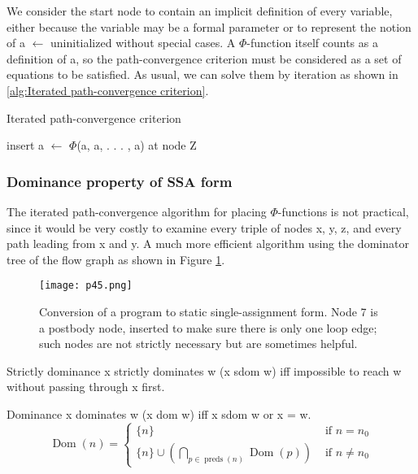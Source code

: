 We consider the start node to contain an implicit definition of every variable, either because the variable may be a formal parameter or to represent the notion of a
$\leftarrow$ uninitialized without special cases. A $\Phi$-function itself counts as a definition of a, so the path-convergence criterion must be considered as a set of equations to be satisfied. As usual, we can solve them by iteration as shown in \ref{alg:Iterated path-convergence criterion}.


\begin{algorithm}
	\caption{Iterated path-convergence criterion}\label{alg:Iterated path-convergence criterion}
	\begin{algorithmic}

		\State  insert a $\leftarrow$ $\Phi$(a, a, . . . , a) at node Z
		\EndWhile
	\end{algorithmic}
\end{algorithm}

\subsubsection{Dominance property of SSA form}

The iterated path-convergence algorithm for placing $\Phi$-functions is not practical, since it would be very costly to examine every triple of nodes x, y, z, and every path leading from x and y.  A much more efficient algorithm using the dominator tree of the flow graph as shown in Figure \ref{fig:p45}.


\begin{figure}[H]
	\centering
	\texttt{[image: p45.png]}
	\caption{ Conversion of a program to static single-assignment form. Node 7 is a postbody node, inserted to make sure there is only one loop edge; such nodes are not strictly necessary but are sometimes helpful.}
	\label{fig:p45}

\end{figure}


\begin{definition}{Strictly dominance}
	x strictly dominates w (x sdom w) iff impossible to reach w without passing through x first.
\end{definition}

\begin{definition}{Dominance}
	x  dominates w (x dom w) iff x sdom w or x = w.
	$$
		\operatorname{Dom}(n)= \begin{cases}\{n\} & \text { if } n=n_0 \\ \{n\} \cup\left(\bigcap_{p \in \operatorname{preds}(n)} \operatorname{Dom}(p)\right) & \text { if } n \neq n_0\end{cases}
	$$
\end{definition}

